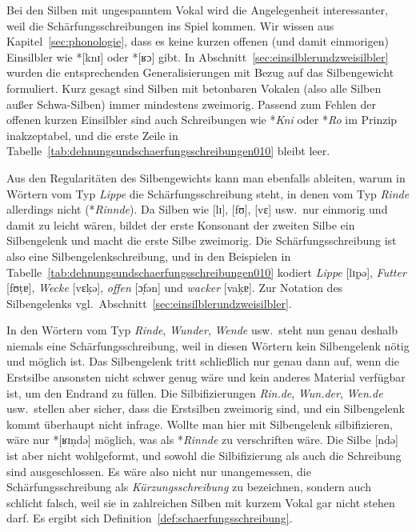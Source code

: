 Bei den Silben mit ungespanntem Vokal wird die Angelegenheit interessanter, weil die Schärfungsschreibungen ins Spiel kommen.
Wir wissen aus Kapitel~\ref{sec:phonologie}, dass es keine kurzen offenen (und damit einmorigen) Einsilbler wie *[knɪ] oder *[ʁɔ] gibt.
In Abschnitt~\ref{sec:einsilblerundzweisilbler} wurden die entsprechenden Generalisierungen mit Bezug auf das Silbengewicht formuliert.
Kurz gesagt sind Silben mit betonbaren Vokalen (also alle Silben außer Schwa-Silben) immer mindestens zweimorig.
Passend zum Fehlen der offenen kurzen Einsilbler sind auch Schreibungen wie *\textit{Kni} oder *\textit{Ro} im Prinzip inakzeptabel, und die erste Zeile in Tabelle~\ref{tab:dehnungsundschaerfungsschreibungen010} bleibt leer.

Aus den Regularitäten des Silbengewichts kann man ebenfalls ableiten, warum in Wörtern vom Typ \textit{Lippe} die Schärfungsschreibung steht, in denen vom Typ \textit{Rinde} allerdings nicht (*\textit{Rinnde}).
Da Silben wie [lɪ], [fʊ], [vɛ] usw.\ nur einmorig und damit zu leicht wären, bildet der erste Konsonant der zweiten Silbe ein Silbengelenk und macht die erste Silbe zweimorig.
Die Schärfungsschreibung ist also eine Silbengelenkschreibung, und in den Beispielen in Tabelle~\ref{tab:dehnungsundschaerfungsschreibungen010} kodiert \textit{Lippe} [lɪp̣ə], \textit{Futter} [fʊṭɐ], \textit{Wecke} [vɛḳə], \textit{offen} [ɔf̣ən] und \textit{wacker} [vaḳɐ].
Zur Notation des Silbengelenks vgl.\ Abschnitt~\ref{sec:einsilblerundzweisilbler}.

In den Wörtern vom Typ \textit{Rinde}, \textit{Wunder}, \textit{Wende} usw.\ steht nun genau deshalb niemals eine Schärfungsschreibung, weil in diesen Wörtern kein Silbengelenk nötig und möglich ist.
Das Silbengelenk tritt schließlich nur genau dann auf, wenn die Erstsilbe ansonsten nicht schwer genug wäre und kein anderes Material verfügbar ist, um den Endrand zu füllen.
Die Silbifizierungen \textit{Rin.de}, \textit{Wun.der}, \textit{Wen.de} usw.\ stellen aber sicher, dass die Erstsilben zweimorig sind, und ein Silbengelenk kommt überhaupt nicht infrage.
Wollte man hier mit Silbengelenk silbifizieren, wäre nur *[ʁɪṇdə] möglich, was als *\textit{Rinnde} zu verschriften wäre.
Die Silbe [ndə] ist aber nicht wohlgeformt, und sowohl die Silbifizierung als auch die Schreibung sind ausgeschlossen.
Es wäre also nicht nur unangemessen, die Schärfungsschreibung als \textit{Kürzungsschreibung} zu bezeichnen, sondern auch schlicht falsch, weil sie in zahlreichen Silben mit kurzem Vokal gar nicht stehen darf.
Es ergibt sich Definition~\ref{def:schaerfungsschreibung}.

